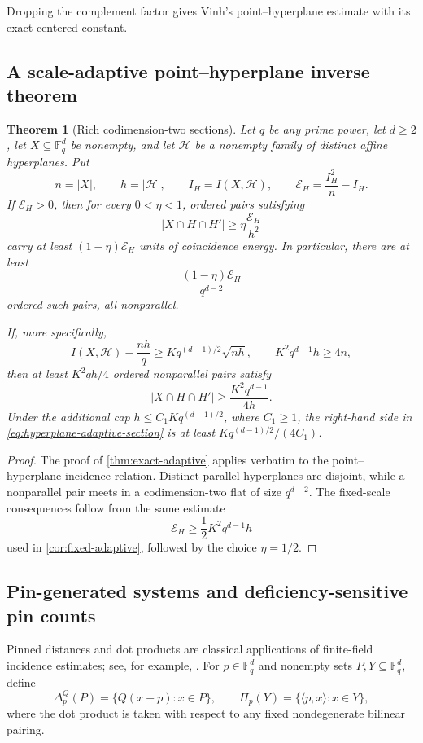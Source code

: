 \documentclass[11pt,letterpaper]{amsart}
\newtheorem{theorem}{Theorem}[section]
\theoremstyle{definition}
\theoremstyle{remark}
\newcommand{\1}{\mathbf 1}
\begin{document}
Dropping the complement factor gives Vinh's point--hyperplane estimate \cite{Vinh} with its exact centered constant.

\subsection{A scale-adaptive point--hyperplane inverse theorem}

\begin{theorem}[Rich codimension-two sections]\label{thm:hyperplane-adaptive}
Let $q$ be any prime power, let $d\ge2$, let $X\subseteq\mathbb F_q^d$ be nonempty, and let $\mathcal H$ be a nonempty family of distinct affine hyperplanes.  Put
\[
 n=|X|,\qquad h=|\mathcal H|,\qquad I_H=I(X,\mathcal H),
 \qquad \mathcal E_H=\frac{I_H^2}{n}-I_H.
\]
If $\mathcal E_H>0$, then for every $0<\eta<1$, ordered pairs satisfying
\[
 |X\cap H\cap H'|\ge\eta\frac{\mathcal E_H}{h^2}
\]
carry at least $(1-\eta)\mathcal E_H$ units of coincidence energy.  In particular, there are at least
\[
 \frac{(1-\eta)\mathcal E_H}{q^{d-2}}
\]
ordered such pairs, all nonparallel.

If, more specifically,
\[
 I(X,\mathcal H)-\frac{nh}{q}
 \ge Kq^{(d-1)/2}\sqrt{nh},
 \qquad K^2q^{d-1}h\ge4n,
\]
then at least $K^2qh/4$ ordered nonparallel pairs satisfy
\begin{equation}\label{eq:hyperplane-adaptive-section}
 |X\cap H\cap H'|\ge\frac{K^2q^{d-1}}{4h}.
\end{equation}
Under the additional cap $h\le C_1Kq^{(d-1)/2}$, where $C_1\ge1$, the right-hand side in \eqref{eq:hyperplane-adaptive-section} is at least $Kq^{(d-1)/2}/(4C_1)$.
\end{theorem}

\begin{proof}
The proof of \cref{thm:exact-adaptive} applies verbatim to the point--hyperplane incidence relation.  Distinct parallel hyperplanes are disjoint, while a nonparallel pair meets in a codimension-two flat of size $q^{d-2}$.  The fixed-scale consequences follow from the same estimate
\[
 \mathcal E_H\ge\frac12K^2q^{d-1}h
\]
used in \cref{cor:fixed-adaptive}, followed by the choice $\eta=1/2$.
\end{proof}

\subsection{Pin-generated systems and deficiency-sensitive pin counts}

Pinned distances and dot products are classical applications of finite-field incidence estimates; see, for example, \cite{Chapman,HIKR}.  For $p\in\mathbb F_q^d$ and nonempty sets $P,Y\subseteq\mathbb F_q^d$, define
\[
 \Delta_p^Q(P)=\{Q(x-p):x\in P\},
 \qquad
 \Pi_p(Y)=\{\langle p,x\rangle:x\in Y\},
\]
where the dot product is taken with respect to any fixed nondegenerate bilinear pairing.
\end{document}
